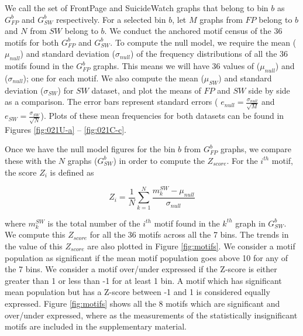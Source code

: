  
 We call the set of FrontPage and SuicideWatch graphs that belong to bin $b$ as $G^b_{FP}$ and $G^b_{SW}$ respectively. For a selected bin $b$, let $M$ graphs from $FP$ belong to $b$ and $N$ from $SW$ belong to $b$. We conduct the anchored motif census of the 36 motifs for both $G^b_{FP}$ and $G^b_{SW}$.  
To compute the null model, we require the mean ($\mu_{null}$) and standard deviation ($\sigma_{null}$) of the frequency distributions of all the 36 motifs found in the $G^b_{FP}$ graphs. This means we will have 36 values of ($\mu_{null}$) and ($\sigma_{null}$); one for each motif. We also compute the mean ($\mu_{SW}$) and standard deviation ($\sigma_{SW}$) for $SW$ dataset, and plot the means of $FP$ and $SW$ side by side as a comparison. The error bars represent standard errors ( $ e_{null} = \frac{\sigma_{null}}{\sqrt{M}}$ and $ e_{SW} = \frac{\sigma_{SW}}{\sqrt{N}}$). Plots of these mean frequencies for both datasets can be found in Figures \ref{fig:021U-a} -- \ref{fig:021C-c}.

Once we have the null model figures for the bin $b$ from $G^b_{FP}$ graphs, we  compare these with the $N$  graphs ($G^b_{SW}$) in order to compute the $Z_{score}$. For the $i^{th}$ motif, the score $Z_{i}$ is defined as 

$$Z_i = \frac{1}{N} \sum_{k=1}^{N} \frac{m_k^{SW} - \mu_{null}}{\sigma_{null}}$$ 

where $m_k^{SW}$ is the total number of the $i^{th}$ motif found in the $k^{th}$ graph in $G^b_{SW}$. We compute this $Z_{score}$ for all the 36 motifs across all the 7 bins. The trends in the value of this $Z_{score}$ are also plotted in Figure \ref{fig:motifs}. We consider a motif population as significant if the mean motif population goes above 10 for any of the 7 bins. We consider a motif over/under expressed if the Z-score is either greater than 1 or less than -1 for at least 1 bin. A motif which has significant mean population but has a Z-score between -1 and 1 is considered equally expressed. Figure \ref{fig:motifs} shows all the 8 motifs which are significant and over/under expressed, 
where as the measurements of the statistically insignificant motifs are included in the supplementary material.